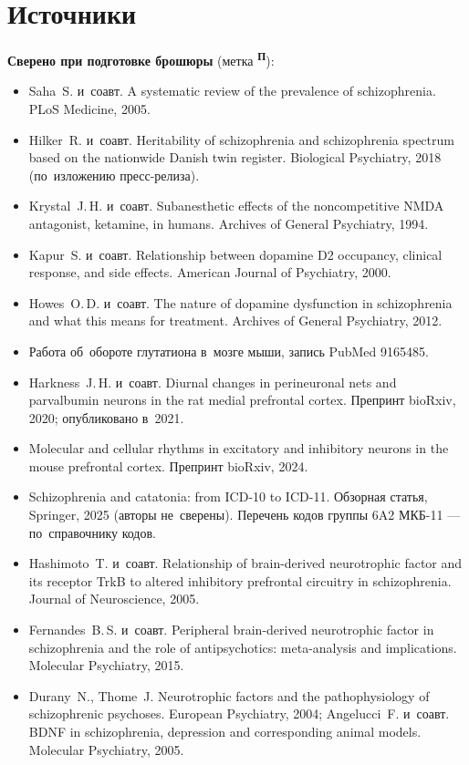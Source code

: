 \documentclass[11pt,a4paper,landscape,twocolumn]{article}
\newcommand{\tP}{\textsuperscript{\sffamily\bfseries\color{cA}П}}
\begin{document}
\section{Источники}
{\small
\textbf{Сверено при подготовке брошюры} (метка \tP):
\begin{itemize}
\item Saha~S. и~соавт. A systematic review of the prevalence of schizophrenia. PLoS Medicine, 2005.
\item Hilker~R. и~соавт. Heritability of schizophrenia and schizophrenia spectrum based on the nationwide Danish twin register. Biological Psychiatry, 2018 (по~изложению пресс-релиза).
\item Krystal~J.\,H. и~соавт. Subanesthetic effects of the noncompetitive NMDA antagonist, ketamine, in humans. Archives of General Psychiatry, 1994.
\item Kapur~S. и~соавт. Relationship between dopamine D2 occupancy, clinical response, and side effects. American Journal of Psychiatry, 2000.
\item Howes~O.\,D. и~соавт. The nature of dopamine dysfunction in schizophrenia and what this means for treatment. Archives of General Psychiatry, 2012.
\item Работа об~обороте глутатиона в~мозге мыши, запись PubMed 9165485.
\item Harkness~J.\,H. и~соавт. Diurnal changes in perineuronal nets and parvalbumin neurons in the rat medial prefrontal cortex. Препринт bioRxiv, 2020; опубликовано в~2021.
\item Molecular and cellular rhythms in excitatory and inhibitory neurons in the mouse prefrontal cortex. Препринт bioRxiv, 2024.
\item Schizophrenia and catatonia: from ICD-10 to ICD-11. Обзорная статья, Springer, 2025 (авторы не~сверены). Перечень кодов группы 6A2 МКБ-11 — по~справочнику кодов.
\item Hashimoto~T. и~соавт. Relationship of brain-derived neurotrophic factor and its receptor TrkB to altered inhibitory prefrontal circuitry in schizophrenia. Journal of Neuroscience, 2005.
\item Fernandes~B.\,S. и~соавт. Peripheral brain-derived neurotrophic factor in schizophrenia and the role of antipsychotics: meta-analysis and implications. Molecular Psychiatry, 2015.
\item Durany~N., Thome~J. Neurotrophic factors and the pathophysiology of schizophrenic psychoses. European Psychiatry, 2004; Angelucci~F. и~соавт. BDNF in schizophrenia, depression and corresponding animal models. Molecular Psychiatry, 2005.

\end{itemize}}
\end{document}
